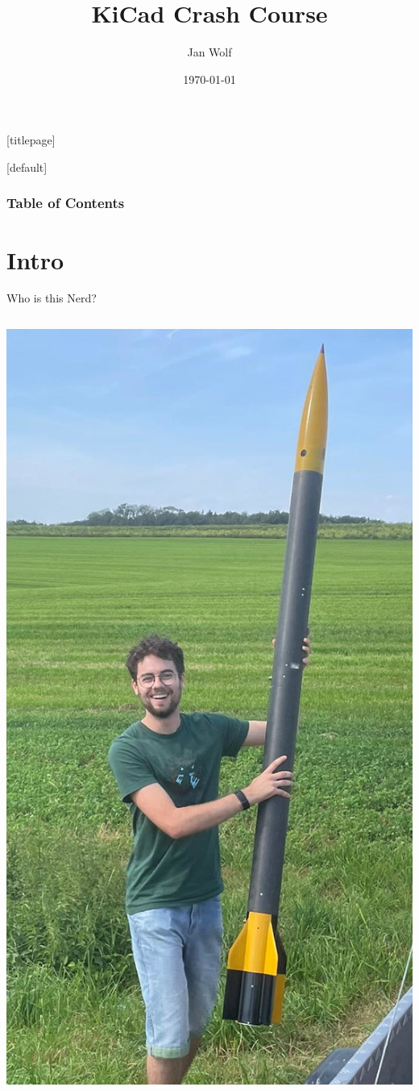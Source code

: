 \documentclass{beamer}
\title[KiCad Crash Course]{KiCad Crash Course}
\author[Jan Wolf]{Jan Wolf}
\date[\today]{\today}
\institute[WüSpace e.V.]{WüSpace e.V.}
\begin{document}
[titlepage]
\begin{frame}
  \titlepage
\end{frame}

[default]
\begin{frame}
  \frametitle{Table of Contents}
  \tableofcontents[subsectionstyle=show/hide]
\end{frame}

\section{Intro}

\begin{frame}{Who is this Nerd?}
    \begin{columns}
  \includegraphics[width=\textwidth]{images/happy-jan.jpg}

\end{columns}
\end{frame}
\end{document}
